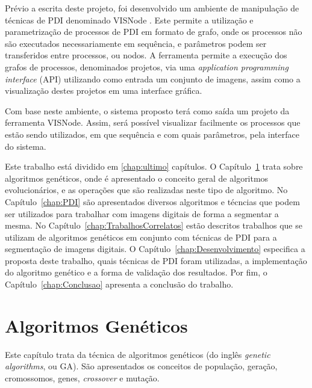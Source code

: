 \documentclass[12pt,oneside,a4paper,english,french,spanish,brazil,]{abntex2}
\begin{document}
Prévio a escrita deste projeto, foi desenvolvido um ambiente de manipulação de técnicas de PDI denominado VISNode \cite{visnode:2018}. Este permite a utilização e parametrização de processos de PDI em formato de grafo, onde os processos não são executados necessariamente em sequência, e parâmetros podem ser transferidos entre processos, ou nodos. A ferramenta permite a execução dos grafos de processos, denominados projetos, via uma \textit{application programming interface} (API) utilizando como entrada um conjunto de imagens, assim como a visualização destes projetos em uma interface gráfica.

Com base neste ambiente, o sistema proposto terá como saída um projeto da ferramenta VISNode. Assim, será possível visualizar facilmente os processos que estão sendo utilizados, em que sequência e com quais parâmetros, pela interface do sistema.

Este trabalho está dividido em \ref{chap:ultimo} capítulos. O Capítulo~\ref{chap:AlgoritmosGeneticos} trata sobre algoritmos genéticos, onde é apresentado o conceito geral de algoritmos evolucionários, e as operações que são realizadas neste tipo de algoritmo. No Capítulo~\ref{chap:PDI} são apresentados diversos algoritmos e técncias que podem ser utilizados para trabalhar com imagens digitais de forma a segmentar a mesma. No Capítulo~\ref{chap:TrabalhosCorrelatos} estão descritos trabalhos que se utilizam de algoritmos genéticos em conjunto com técnicas de PDI para a segmentação de imagens digitais. O Capítulo~\ref{chap:Desenvolvimento} especifica a proposta deste trabalho, quais técnicas de PDI foram utilizadas, a implementação do algoritmo genético e a forma de validação dos resultados. Por fim, o Capítulo~\ref{chap:Conclusao} apresenta a conclusão do trabalho.

\chapter{Algoritmos Genéticos}
\label{chap:AlgoritmosGeneticos}

Este capítulo trata da técnica de algoritmos genéticos (do inglês \textit{genetic algorithms}, ou GA). São apresentados os conceitos de população, geração, cromossomos, genes, \textit{crossover} e mutação.
\end{document}
